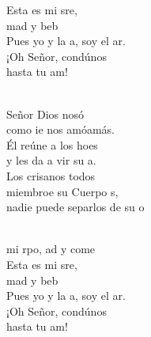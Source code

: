 \documentclass[12pt]{article}
\begin{document}
\begin{multicols*}{2}
\begin{cancion}
\begin{chorus}
	Esta es mi sre,\\
	mad y beb\\
	Pues yo y la a, soy el ar.\\
	¡Oh Señor, condúnos \\
	hasta tu am!   \\
	\end{chorus}%
	\jump\\
	 Señor Dios nosó\\
	como ie nos amóamás.\\
	Él reúne a los hoes\\
	y les da a vir su a.\\
	Los crisanos todos \\
	miembroe su Cuerpo s,\\
	nadie puede separlos de su o \\\jump\\
	\begin{chorus}%
	 mi rpo, ad y come\\
	Esta es mi sre,\\
	mad y beb\\
	Pues yo y la a, soy el ar.\\
	¡Oh Señor, condúnos \\
	hasta tu am!   \\
	\end{chorus}%
	\jump\\
\end{cancion}%


\end{multicols*}
\end{document}
